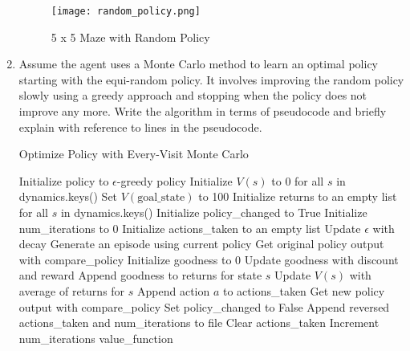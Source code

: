 \documentclass[letterpaper]{article} %
\begin{document}
\begin{enumerate}
	\begin{figure}[htbp]
	  \centering
	  \texttt{[image: random\_policy.png]}
	  \caption{5 x 5 Maze with Random Policy}
	  \label{fig:random_policy}
	\end{figure}

    \item Assume the agent uses a Monte Carlo method to learn an optimal policy starting with the equi-random policy. It involves improving the random policy slowly using a greedy approach and stopping when the policy does not improve any more. Write the algorithm in terms of pseudocode and briefly explain with reference to lines in the pseudocode.


    \begin{algorithm}
    \caption{Optimize Policy with Every-Visit Monte Carlo}
    \begin{algorithmic}[1]
    \State Initialize policy to $\epsilon$-greedy policy \label{alg:greedy_policy}
    \State Initialize $V(s)$ to 0 for all $s$ in dynamics.keys()
    \State Set $V(\text{goal\_state})$ to 100
    \State Initialize returns to an empty list for all $s$ in dynamics.keys()
    \State Initialize policy\_changed to True
    \State Initialize num\_iterations to 0
    \State Initialize actions\_taken to an empty list
	\State Update $\epsilon$ with decay
	\State Generate an episode using current policy
	\State Get original policy output with compare\_policy
	\State Initialize goodness to 0
	\label{alg:reversed_episode}
	    \State Update goodness with discount and reward
	    \State Append goodness to returns for state $s$
	    \State Update $V(s)$ with average of returns for $s$
	    \State Append action $a$ to actions\_taken
	\EndFor
	\State Get new policy output with compare\_policy \label{alg:action_compare}
	    \State Set policy\_changed to False
	    \State Append reversed actions\_taken and num\_iterations to file
	\EndIf
	\State Clear actions\_taken
	\State Increment num\_iterations
    \EndWhile
    \State \Return value\_function
    \end{algorithmic}
      \label{alg:every_visit_mc}
    \end{algorithm}





\end{enumerate}
\end{document}
